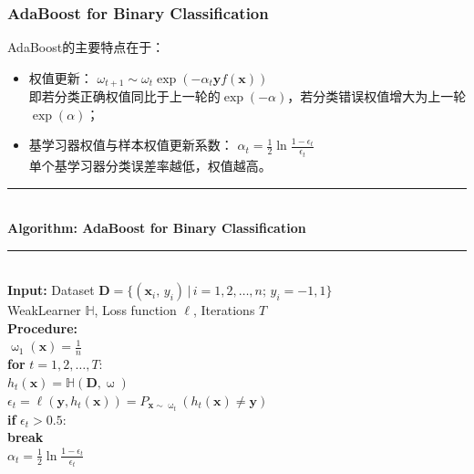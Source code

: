 \documentclass[a4paper]{article}
\begin{document}
		\subsubsection{AdaBoost for Binary Classification}
		AdaBoost的主要特点在于：
		\begin{itemize}
				\item 权值更新：
					$\omega_{t+1} \sim \omega_t\exp(-\alpha_t\textbf{y} f(\textbf{x}))$\\
					即若分类正确权值同比于上一轮的$\exp(-\alpha)$，若分类错误权值增大为上一轮$\exp(\alpha)$；
				\item 基学习器权值与样本权值更新系数：
					$\alpha_t = \frac{1}{2}\ln \frac{1-\epsilon_t}{\epsilon_t}$\\
					单个基学习器分类误差率越低，权值越高。
		\end{itemize}
			\noindent\rule[0.1\baselineskip]{\textwidth}{0.75pt}\\
			\textbf{Algorithm: AdaBoost for Binary Classification}\\
			\noindent\rule[0.1\baselineskip]{\textwidth}{0.5pt}\\
			\textbf{Input:} Dataset $\textbf{D} = \{(\mathbf{x}_i,\,y_i)\,|\,i = 1, 2,\dots, n;\, y_i = -1, 1\}$\\
			\hspace*{32pt} WeakLearner $\mathbb{H}$, Loss function $\ell$, Iterations $T$\\
			\textbf{Procedure:} \\
					\hspace*{32pt}	$\upomega_1(\textbf{x}) = \frac{1}{n}$\\
					\hspace*{32pt}	\textbf{for} $t = 1, 2,\dots, T$:\\
							\hspace*{48pt}	$h_t(\textbf{x}) = \mathbb{H}(\textbf{D}, \upomega)$\\
							\hspace*{48pt}	$\epsilon_t = \ell(\textbf{y}, h_t(\textbf{x})) = P_{\textbf{x}\sim\upomega_t}(h_t(\textbf{x}) \neq \textbf{y})$\\
							\hspace*{48pt} 	\textbf{if} $\epsilon_t > 0.5$: \\
							\hspace*{64pt}	\textbf{break}\\
							\hspace*{48pt} 	$\alpha_t = \frac{1}{2}\ln\frac{1-\epsilon_t}{\epsilon_t}$\\
\end{document}
